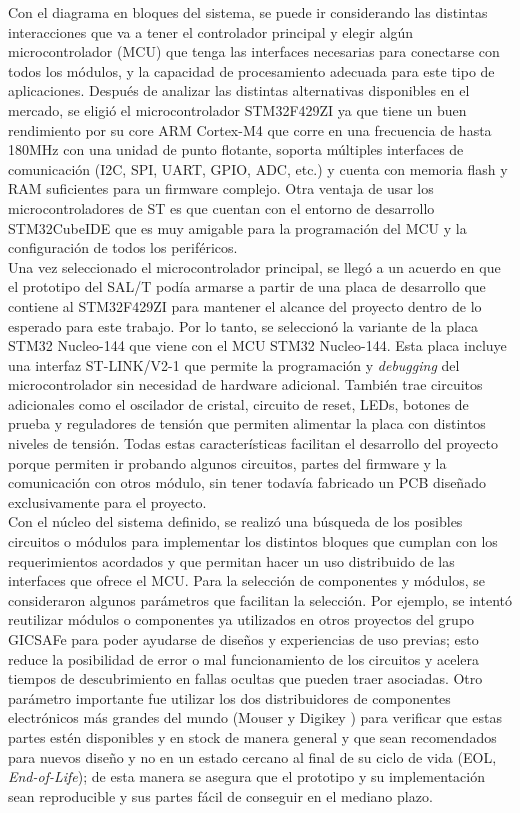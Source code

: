 Con el diagrama en bloques del sistema, se puede ir considerando las distintas interacciones que va a tener el controlador principal y elegir algún microcontrolador (MCU) que tenga las interfaces necesarias para conectarse con todos los módulos, y la capacidad de procesamiento adecuada para este tipo de aplicaciones. Después de analizar las distintas alternativas disponibles en el mercado, se eligió el microcontrolador STM32F429ZI ya que tiene un buen rendimiento por su core ARM Cortex-M4 que corre en una frecuencia de hasta 180MHz con una unidad de punto flotante, soporta múltiples interfaces de comunicación (I2C, SPI, UART, GPIO, ADC, etc.) y cuenta con memoria flash y RAM suficientes para un firmware complejo. Otra ventaja de usar los microcontroladores de ST es que cuentan con el entorno de desarrollo STM32CubeIDE que es muy amigable para la programación del MCU y la configuración de todos los periféricos. \\ 


Una vez seleccionado el microcontrolador principal, se llegó a un acuerdo en que el prototipo del SAL/T podía armarse a partir de una placa de desarrollo que contiene al STM32F429ZI para mantener el alcance del proyecto dentro de lo esperado para este trabajo. Por lo tanto, se seleccionó la variante de la placa STM32 Nucleo-144 que viene con el MCU STM32 Nucleo-144. Esta placa incluye una interfaz ST-LINK/V2-1 que permite la programación y \textit{debugging} del microcontrolador sin necesidad de hardware adicional. También trae circuitos adicionales como el oscilador de cristal, circuito de reset, LEDs, botones de prueba y reguladores de tensión que permiten alimentar la placa con distintos niveles de tensión. Todas estas características facilitan el desarrollo del proyecto porque permiten ir probando algunos circuitos, partes del firmware y la comunicación con otros módulo, sin tener todavía fabricado un PCB diseñado exclusivamente para el proyecto. \\


Con el núcleo del sistema definido, se realizó una búsqueda de los posibles circuitos o módulos para implementar los distintos bloques que cumplan con los requerimientos acordados y que permitan hacer un uso distribuido de las interfaces que ofrece el MCU. Para la selección de componentes y módulos, se consideraron algunos parámetros que facilitan la selección. Por ejemplo, se intentó reutilizar módulos o componentes ya utilizados en otros proyectos del grupo GICSAFe para poder ayudarse de diseños y experiencias de uso previas; esto reduce la posibilidad de error o mal funcionamiento de los circuitos y acelera tiempos de descubrimiento en fallas ocultas que pueden traer asociadas. Otro parámetro importante fue utilizar los dos distribuidores de componentes electrónicos más grandes del mundo (Mouser \cite{mouser} y Digikey \cite{digikey}) para verificar que estas partes estén disponibles y en stock de manera general y que sean recomendados para nuevos diseño y no en un estado cercano al final de su ciclo de vida (EOL, \textit{End-of-Life}); de esta manera se asegura que el prototipo y su implementación sean reproducible y sus partes fácil de conseguir en el mediano plazo. \\

